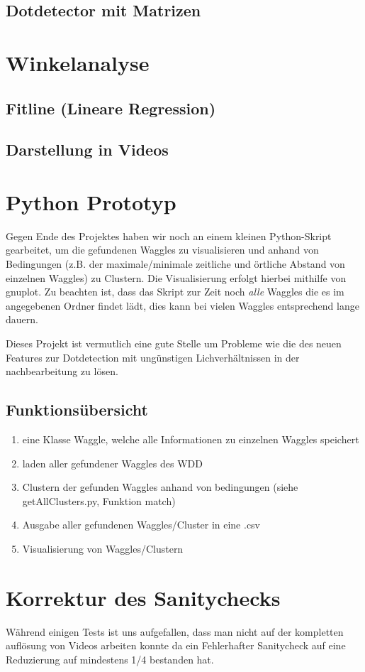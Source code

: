\documentclass[11pt,a4paper]{article}
\begin{document}
\subsection{Dotdetector mit Matrizen}%

\section{Winkelanalyse}%

\subsection{Fitline (Lineare Regression)}%
\subsection{Darstellung in Videos}%


\section{Python Prototyp}%
Gegen Ende des Projektes haben wir noch an einem kleinen Python-Skript gearbeitet, um die gefundenen Waggles zu visualisieren und anhand von Bedingungen (z.B. der maximale/minimale zeitliche und örtliche Abstand von einzelnen Waggles) zu Clustern. Die Visualisierung erfolgt hierbei mithilfe von gnuplot. Zu beachten ist, dass das Skript zur Zeit noch \emph{alle} Waggles die es im angegebenen Ordner findet lädt, dies kann bei vielen Waggles entsprechend lange dauern.

Dieses Projekt ist vermutlich eine gute Stelle um Probleme wie die des neuen Features zur Dotdetection mit ungünstigen Lichverhältnissen in der nachbearbeitung zu lösen.
\subsection{Funktionsübersicht}%
\begin{enumerate}
\item eine Klasse Waggle, welche alle Informationen zu einzelnen Waggles speichert
\item laden aller gefundener Waggles des WDD
\item Clustern der gefunden Waggles anhand von bedingungen (siehe getAllClusters.py, Funktion match)
\item Ausgabe aller gefundenen Waggles/Cluster in eine .csv
\item Visualisierung von Waggles/Clustern\\
\end{enumerate}

\section{Korrektur des Sanitychecks}
Während einigen Tests ist uns aufgefallen, dass man nicht auf der kompletten auflösung von Videos arbeiten konnte da ein Fehlerhafter Sanitycheck auf eine Reduzierung auf mindestens 1/4 bestanden hat.
\end{document}
